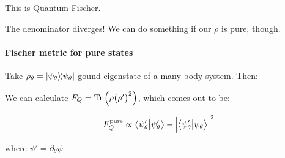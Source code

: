 \documentclass[main.tex]{subfiles}
\begin{document}
This is Quantum Fischer. %

The denominator diverges! We can do something if our \(\rho\) is pure, though.

\paragraph{Fischer metric for pure states}

Take \( \rho_\theta = \ketbra{\psi_\theta} \) gound-eigenstate of a many-body system. Then:

\begin{claim}
We can calculate  \( F_Q =  \operatorname*{Tr} \qty(\rho \qty(\rho')^2)\), which comes out to be:

\begin{equation}
F_Q ^{\text{pure}} \propto \braket{\psi_\theta'}{\psi_\theta'} - \abs{\braket{\psi_\theta'}{\psi_\theta}}^2
\end{equation}

where \( \psi' = \partial_\theta \psi \).
\end{claim}
\end{document}
